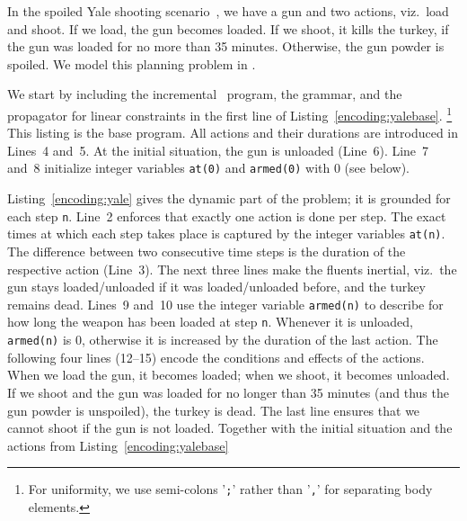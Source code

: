In the spoiled Yale shooting scenario~\cite{caotpo00a},
we have a gun and two actions, viz.\ load and shoot.
If we load, the gun becomes loaded.
If we shoot, it kills the turkey, if the gun was loaded for no more than 35 minutes.
Otherwise, the gun powder is spoiled.
We model this planning problem in .

We start by including the incremental \python\ program,
the grammar, and the propagator for linear constraints in the first line of Listing~\ref{encoding:yalebase}.%
\footnote{For uniformity, we use semi-colons '\texttt{;}' rather than '\texttt{,}' for separating body elements.}
This listing is the base program.
All actions and their durations are introduced in Lines~4 and~5.
At the initial situation, the gun is unloaded (Line~6).
Line~7 and~8 initialize integer variables \texttt{at(0)} and \texttt{armed(0)} with 0 (see below).

Listing~\ref{encoding:yale} gives the dynamic part of the problem;
it is grounded for each step \texttt{n}.
Line~2 enforces that exactly one action is done per step.
The exact times at which each step takes place is captured by the integer variables \texttt{at(n)}.
The difference between two consecutive time steps is the duration
of the respective action (Line~3).
%
The next three lines make the fluents inertial, viz.\
the gun stays loaded/unloaded if it was loaded/unloaded before,
and the turkey remains dead.
%
Lines~9 and~10 use the integer variable \texttt{armed(n)}
to describe for how long the weapon has been loaded at step \texttt{n}.
Whenever it is unloaded, \texttt{armed(n)} is 0,
otherwise it is increased by the duration of the last action.
%
The following four lines (12--15) encode the conditions and effects of the actions.
When we load the gun, it becomes loaded; when we shoot, it becomes unloaded.
If we shoot and the gun was loaded for no longer than 35 minutes (and thus the gun powder is unspoiled),
the turkey is dead.
The last line ensures that we cannot shoot if the gun is not loaded.
Together with the initial situation and the actions from Listing~\ref{encoding:yalebase}
